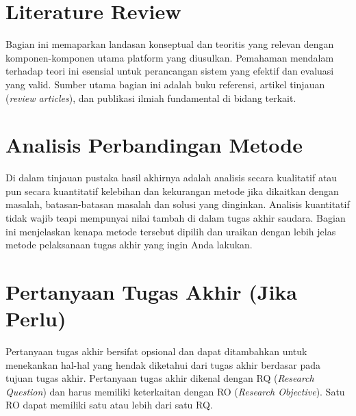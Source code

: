 \section{Literature Review}
\label{sec:literature_review}

Bagian ini memaparkan landasan konseptual dan teoritis yang relevan dengan komponen-komponen utama platform yang diusulkan. Pemahaman mendalam terhadap teori ini esensial untuk perancangan sistem yang efektif dan evaluasi yang valid. Sumber utama bagian ini adalah buku referensi, artikel tinjauan (\textit{review articles}), dan publikasi ilmiah fundamental di bidang terkait.


\section{Analisis Perbandingan Metode}
\label{sec:analisis_metode_revised}

Di dalam tinjauan pustaka hasil akhirnya adalah analisis secara kualitatif atau pun secara kuantitatif kelebihan dan kekurangan metode jika dikaitkan dengan masalah, batasan-batasan masalah dan solusi yang dinginkan. Analisis kuantitatif tidak wajib teapi mempunyai nilai tambah di dalam tugas akhir saudara. Bagian ini menjelaskan kenapa metode tersebut dipilih dan uraikan dengan lebih jelas metode pelaksanaan tugas akhir yang ingin Anda lakukan. 

\section{Pertanyaan Tugas Akhir (Jika Perlu)}
\label{sec:pertanyaan_ta_revised}

Pertanyaan tugas akhir bersifat opsional dan dapat ditambahkan untuk menekankan hal-hal yang hendak diketahui dari tugas akhir berdasar pada tujuan tugas akhir. Pertanyaan tugas akhir dikenal dengan RQ (\textit{Research Question}) dan harus memiliki keterkaitan dengan RO (\textit{Research Objective}). Satu RO dapat memiliki satu atau lebih dari satu RQ.
